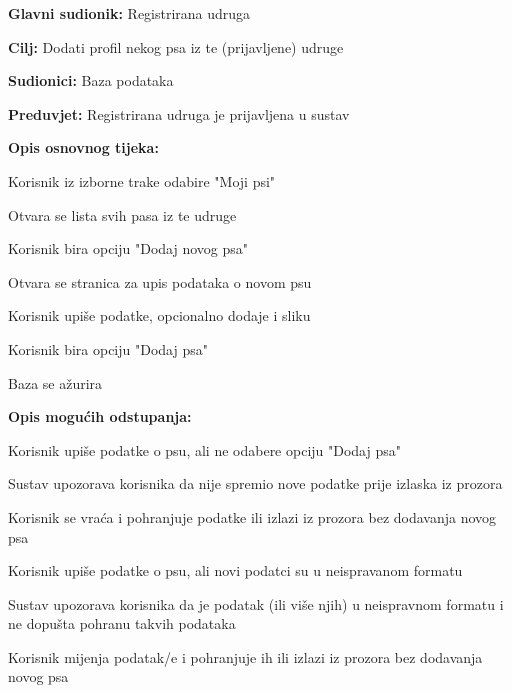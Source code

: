 			
				\noindent {}
			\begin{packed_item}
				
				\item \textbf{Glavni sudionik:} Registrirana udruga
				\item  \textbf{Cilj:} Dodati profil nekog psa iz te (prijavljene) udruge
				\item  \textbf{Sudionici:} Baza podataka
				\item  \textbf{Preduvjet:} Registrirana udruga je prijavljena u sustav
				\item  \textbf{Opis osnovnog tijeka:}
				
				\item[] \begin{packed_enum}
					\item Korisnik iz izborne trake odabire "Moji psi"
					\item Otvara se lista svih pasa iz te udruge
					\item Korisnik bira opciju "Dodaj novog psa"
					\item Otvara se stranica za upis podataka o novom psu 
					\item Korisnik upiše podatke, opcionalno dodaje i sliku
					\item Korisnik bira opciju "Dodaj psa"
					\item Baza se ažurira
				\end{packed_enum}
				
				\item  \textbf{Opis mogućih odstupanja:}
				
				\item[] \begin{packed_item}
					
					\item [4.a]  Korisnik upiše podatke o psu, ali ne odabere opciju "Dodaj psa"
					\item[] \begin{packed_enum}
						
						\item Sustav upozorava korisnika da nije spremio nove podatke prije izlaska iz prozora
						\item Korisnik se vraća i pohranjuje podatke ili izlazi iz prozora bez dodavanja novog psa
					\end{packed_enum}
					
					\item [4.b]  Korisnik upiše podatke o psu, ali novi podatci su u neispravanom formatu
					\item[] \begin{packed_enum}
						
						\item Sustav upozorava korisnika da je podatak (ili više njih) u neispravnom formatu i ne dopušta pohranu takvih podataka
						\item Korisnik mijenja podatak/e i pohranjuje ih ili izlazi iz prozora bez dodavanja novog psa
					\end{packed_enum}
				\end{packed_item}
			\end{packed_item}
		

